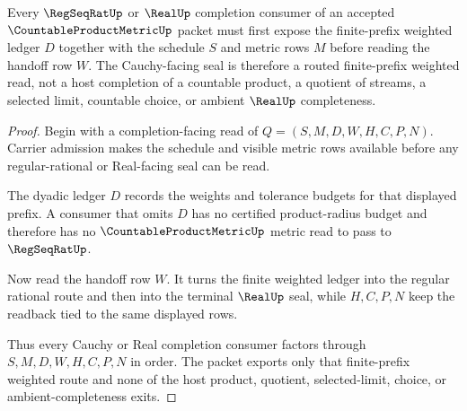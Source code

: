 \begin{theorem}
\label{thm:countable-product-metric-cauchy-consumer-route}
Every $\RegSeqRatUp$ or $\RealUp$ completion consumer of an accepted $\CountableProductMetricUp$ packet must first expose the finite-prefix weighted ledger $D$ together with the schedule $S$ and metric rows $M$ before reading the handoff row $W$. The Cauchy-facing seal is therefore a routed finite-prefix weighted read, not a host completion of a countable product, a quotient of streams, a selected limit, countable choice, or ambient $\RealUp$ completeness.
\end{theorem}
\begin{proof}
Begin with a completion-facing read of $Q=(S,M,D,W,H,C,P,N)$. Carrier admission makes the schedule and visible metric rows available before any regular-rational or Real-facing seal can be read.

The dyadic ledger $D$ records the weights and tolerance budgets for that displayed prefix. A consumer that omits $D$ has no certified product-radius budget and therefore has no $\CountableProductMetricUp$ metric read to pass to $\RegSeqRatUp$.

Now read the handoff row $W$. It turns the finite weighted ledger into the regular rational route and then into the terminal $\RealUp$ seal, while $H,C,P,N$ keep the readback tied to the same displayed rows.

Thus every Cauchy or Real completion consumer factors through $S,M,D,W,H,C,P,N$ in order. The packet exports only that finite-prefix weighted route and none of the host product, quotient, selected-limit, choice, or ambient-completeness exits.
\end{proof}


\begin{closurestatus}{\CountableProductMetricUp}
  \theoryclosure{\seedClosure}
  \formalstatus{\unformalizedV}
\end{closurestatus}
